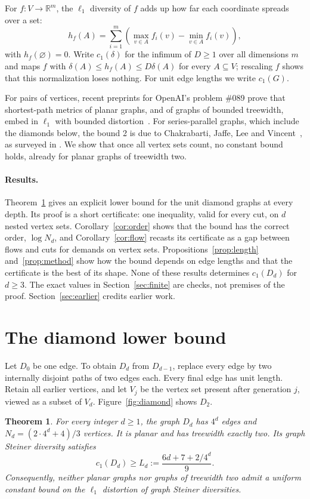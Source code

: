 \documentclass[11pt]{article}
\newtheorem{theorem}{Theorem}
\newcommand{\R}{\mathbb R}
\begin{document}
For $f:V\to\R^m$, the $\ell_1$ diversity of $f$ adds up how far each
coordinate spreads over a set:
\[
h_f(A)=\sum_{i=1}^m\left(\max_{v\in A}f_i(v)-\min_{v\in A}f_i(v)\right),
\]
with $h_f(\varnothing)=0$. Write $c_1(\delta)$ for the infimum of $D\ge1$
over all dimensions $m$ and maps $f$ with
$\delta(A)\le h_f(A)\le D\delta(A)$ for every $A\subseteq V$; rescaling $f$
shows that this normalization loses nothing. For unit edge lengths we write $c_1(G)$.

For pairs of vertices, recent preprints for OpenAI's problem \#089 prove
that shortest-path metrics of planar graphs, and of graphs of bounded
treewidth, embed in $\ell_1$ with bounded
distortion~\cite{OAIplanar,OAItw}. For series-parallel graphs, which include
the diamonds below, the bound 2 is due to Chakrabarti, Jaffe, Lee and
Vincent~\cite{CJLV}, as surveyed in \cite[Section 1.2]{OAIplanar}. We show
that once all vertex sets count, no constant bound holds, already for planar
graphs of treewidth two.

\paragraph{Results.}
Theorem~\ref{thm:main} gives an explicit lower bound for the unit diamond
graphs at every depth. Its proof is a short certificate: one inequality,
valid for every cut, on $d$ nested vertex sets. Corollary~\ref{cor:order}
shows that the bound has the correct order, $\log N_d$, and
Corollary~\ref{cor:flow} recasts its certificate as a gap between flows and
cuts for demands on vertex sets. Propositions~\ref{prop:length} and~\ref{prop:method}
show how the bound depends on edge lengths and that the certificate is the
best of its shape. None of these results determines $c_1(D_d)$ for $d\ge3$.
The exact values in Section~\ref{sec:finite} are checks, not premises of the
proof. Section~\ref{sec:earlier} credits earlier work.

\section{The diamond lower bound}
Let $D_0$ be one edge. To obtain $D_d$ from $D_{d-1}$, replace every edge by
two internally disjoint paths of two edges each. Every final edge has unit
length. Retain all earlier vertices, and let $V_j$ be the vertex set present
after generation $j$, viewed as a subset of $V_d$. Figure~\ref{fig:diamond}
shows $D_2$.

\begin{theorem}\label{thm:main}
For every integer $d\ge1$, the graph $D_d$ has $4^d$ edges and
$N_d=(2\cdot4^d+4)/3$ vertices. It is planar and has treewidth exactly two.
Its graph Steiner diversity satisfies
\[
c_1(D_d)\ge L_d:=\frac{6d+7+2/4^d}{9}.
\]
Consequently, neither planar graphs nor graphs of treewidth two admit a
uniform constant bound on the $\ell_1$ distortion of graph Steiner
diversities.
\end{theorem}
\end{document}
